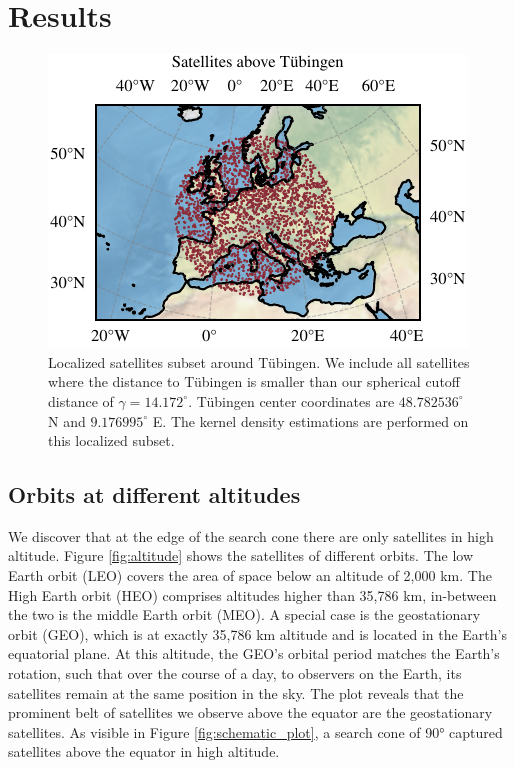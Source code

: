 \documentclass{article}
\theoremstyle{plain}
\theoremstyle{definition}
\theoremstyle{remark}
\begin{document}
\section{Results}\label{sec:results}
\begin{figure}[h]
    \begin{center}
        \includegraphics{fig/satellite_above_tuebingen.pdf}
        \caption{Localized satellites subset around Tübingen. We include all satellites where the distance to Tübingen is smaller than our spherical cutoff distance of $\gamma = 14.172^\circ$. Tübingen center coordinates are $48.782536^\circ$ N and $9.176995^\circ$ E. The kernel density estimations are performed on this localized subset.}
        \label{fig:tue-sample}
    \end{center}
\end{figure}
\subsection{Orbits at different altitudes}
We discover that at the edge of the search cone there are  only satellites in high altitude. 
Figure \ref{fig:altitude} shows the satellites of different orbits.
The low Earth orbit (LEO) covers the area of space below an altitude of 2,000 km. The High Earth orbit (HEO) comprises altitudes higher than 35,786 km, in-between the two is the middle Earth orbit (MEO). 
A special case is the geostationary orbit (GEO), which is at exactly 35,786 km altitude and is located in the Earth's equatorial plane. 
At this altitude, the GEO's orbital period matches the Earth's rotation, such that over the course of a day, to observers on the Earth, its satellites remain at the same position in the sky.
The plot reveals that the prominent belt of satellites we observe above the equator are the geostationary satellites. As visible in Figure \ref{fig:schematic_plot}, a search cone of 90° captured satellites above the equator in high altitude.\\
\end{document}
